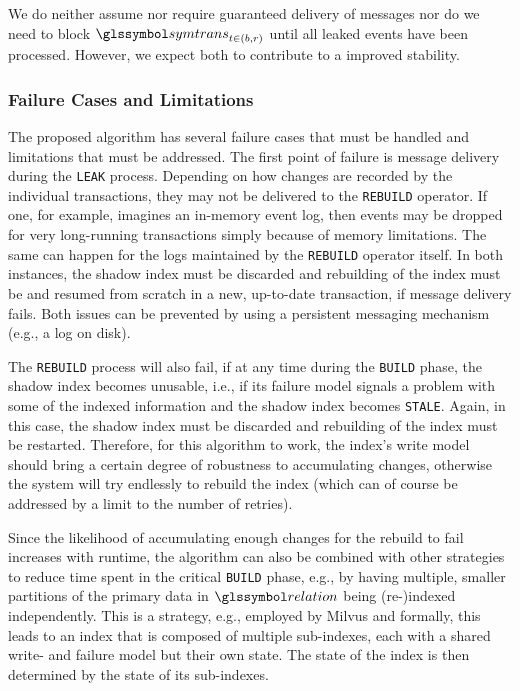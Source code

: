 We do neither assume nor require guaranteed delivery of messages nor do we need to block $\symtrans_{t \in (b, r)}$ until all leaked events have been processed. However, we expect both to contribute to a improved stability.

\subsubsection{Failure Cases and Limitations}

The proposed algorithm has several failure cases that must be handled and limitations that must be addressed. The first point of failure is message delivery during the \texttt{LEAK} process. Depending on how changes are recorded by the individual transactions, they may not be delivered to the \texttt{REBUILD} operator. If one, for example, imagines an in-memory event log, then events may be dropped for very long-running transactions simply because of memory limitations. The same can happen for the logs maintained by the \texttt{REBUILD} operator itself. In both instances, the shadow index must be discarded and rebuilding of the index must be and resumed from scratch in a new, up-to-date transaction, if message delivery fails. Both issues can be prevented by using a persistent messaging mechanism (e.g., a log on disk).

The  \texttt{REBUILD} process will also fail, if at any time during the \texttt{BUILD} phase, the shadow index becomes unusable, i.e., if its failure model signals a problem with some of the indexed information and the shadow index becomes \texttt{STALE}. Again, in this case, the shadow index must be discarded and rebuilding of the index must be restarted. Therefore, for this algorithm to work, the index's write model should bring a certain degree of robustness to accumulating changes, otherwise the system will try endlessly to rebuild the index (which can of course be addressed by a limit to the number of retries).

Since the likelihood of accumulating enough changes for the rebuild to fail increases with runtime, the algorithm can also be combined with other strategies to reduce time spent in the critical \texttt{BUILD} phase, e.g., by having multiple, smaller partitions of the primary data in $\relation$ being (re-)indexed independently. This is a strategy, e.g., employed by Milvus \cite{Wang:2021Milvus} and formally, this leads to an index that is composed of multiple sub-indexes, each with a shared write- and failure model but their own state. The state of the index is then determined by the state of its sub-indexes.


